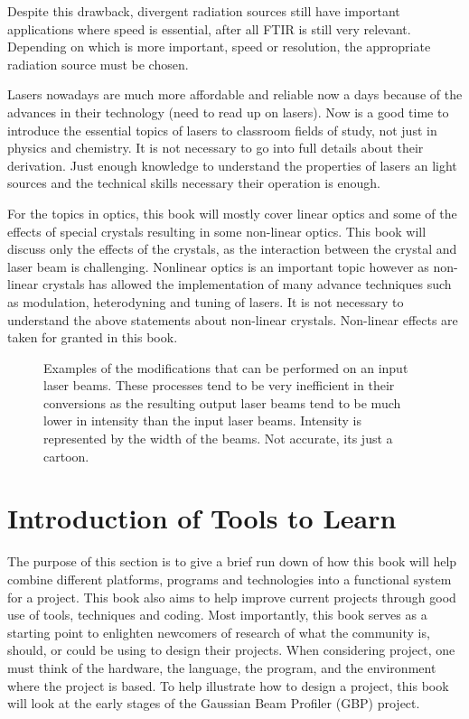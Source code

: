 \documentclass[11pt,a4paper]{book}
\newcommand{\imginput}[1]{} %
\begin{document}
		Despite this drawback, divergent radiation sources still have important applications where speed is essential, after all FTIR is still very relevant. Depending on which is more important, speed or resolution, the appropriate radiation source must be chosen. 
		
		Lasers nowadays are much more affordable and reliable now a days because of the advances in their technology (need to read up on lasers). Now is a good time to introduce the essential topics of lasers to classroom fields of study, not just in physics and chemistry. It is not necessary to go into full details about their derivation. Just enough knowledge to understand the properties of lasers an light sources and the technical skills necessary their operation is enough.
		
		For the topics in optics, this book will mostly cover linear optics and some of the effects of special crystals resulting in some non-linear optics. This book will discuss only the effects of the crystals, as the interaction between the crystal and laser beam is challenging. Nonlinear optics is an important topic however as non-linear crystals has allowed the implementation of many advance techniques such as modulation, heterodyning and tuning of lasers. It is not necessary to understand the above statements about non-linear crystals. Non-linear effects are taken for granted in this book. 
		
		\begin{figure} [!ht]
			\centering
			\def\svgwidth{\columnwidth}
			\resizebox{16cm}{!}{\imginput{images/non-linear-crystals.pdf_tex}}
			\caption{Examples of the modifications that can be performed on an input laser beams. These processes tend to be very inefficient in their conversions as the resulting output laser beams tend to be much lower in intensity than the input laser beams. Intensity is represented by the width of the beams. Not accurate, its just a cartoon.}
			\label{fig:non-linear-crystals}
		\end{figure}
		
	\section{Introduction of Tools to Learn}
		\label{sec:Useful Tools to Learn}
		The purpose of this section is to give a brief run down of how this book will help combine different platforms, programs and technologies into a functional system for a project. This book also aims to help improve current projects through good use of tools, techniques and coding. Most importantly, this book serves as a starting point to enlighten newcomers of research of what the community is, should, or could be using to design their projects. When considering project, one must think of the hardware, the language, the program, and the environment where the project is based. To help illustrate how to design a project, this book will look at the early stages of the Gaussian Beam Profiler (GBP) project.
		
\end{document}
